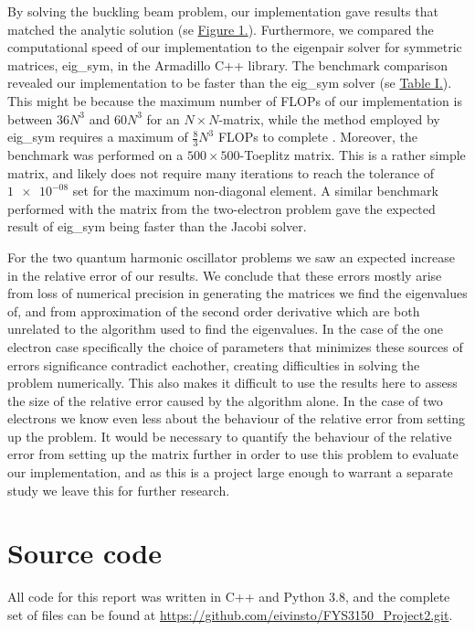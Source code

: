 \documentclass[reprint,english,notitlepage]{revtex4-1}  %
\begin{document}
By solving the buckling beam problem, our implementation gave results that matched the analytic solution (se \hyperref[fig:IV:a:1]{Figure 1.}). Furthermore, we compared the computational speed of our implementation to the eigenpair solver for symmetric matrices, eig\_sym, in the Armadillo C++ library. The benchmark comparison revealed our implementation to be faster than the eig\_sym solver (se \hyperref[table:IV:a:1]{Table I.}). This might be because the maximum number of FLOPs of our implementation is between \(36N^{3}\) and \(60N^{3}\) for an \(N\times N\)-matrix, while the method employed by eig\_sym requires a maximum of \(\frac{8}{3}N^{3}\) FLOPs to complete \citep{Cuppen}. Moreover, the benchmark was performed on a \(500\times 500\)-Toeplitz matrix. This is a rather simple matrix, and likely does not require many iterations to reach the tolerance of \(\num{1e-08}\) set for the maximum non-diagonal element. A similar benchmark performed with the matrix from the two-electron problem gave the expected result of eig\_sym being faster than the Jacobi solver.

For the two quantum harmonic oscillator problems we saw an expected increase in the relative error of our results. We conclude that these errors mostly arise from loss of numerical precision in generating the matrices we find the eigenvalues of, and from approximation of the second order derivative which are both unrelated to the algorithm used to find the eigenvalues. In the case of the one electron case specifically the choice of parameters that minimizes these sources of errors significance contradict eachother, creating difficulties in solving the problem numerically. This also makes it difficult to use the results here to assess the size of the relative error caused by the algorithm alone. In the case of two electrons we know even less about the behaviour of the relative error from setting up the problem. It would be necessary to quantify the behaviour of the relative error from setting up the matrix further in order to use this problem to evaluate our implementation, and as this is a project large enough to warrant a separate study we leave this for further research.

\onecolumngrid
{}
\newpage
\twocolumngrid

\appendix
\section{Source code} \label{A}
All code for this report was written in C++ and Python 3.8, and the complete set of files can be found at
\url{https://github.com/eivinsto/FYS3150_Project2.git}.
\end{document}
